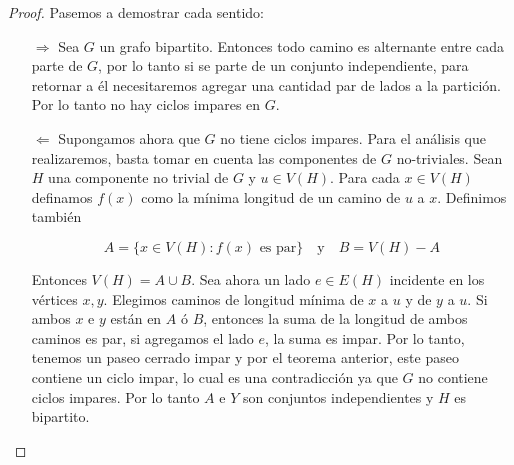 \begin{proof}
    Pasemos a demostrar cada sentido:
    
    \begin{enumerate}
        \item[$\Rightarrow$] Sea $G$ un grafo bipartito. Entonces todo camino es alternante entre cada parte de $G$, por lo tanto si se parte de un conjunto independiente, para retornar a él necesitaremos agregar una cantidad par de lados a la partición. Por lo tanto no hay ciclos impares en $G$.
        
        \item[$\Leftarrow$] Supongamos ahora que $G$ no tiene ciclos impares. Para el análisis que realizaremos, basta tomar en cuenta las componentes de $G$ no-triviales. Sean $H$ una componente no trivial de $G$ y $u \in V(H)$. Para cada $x \in V(H)$ definamos $f(x)$ como la mínima longitud de un camino de $u$ a $x$. Definimos también
        
        \[
        A = \{x \in V(H) : \text{$f(x)$ es par}\} \quad \text{y} \quad B = V(H) - A
        \]
        
        Entonces $V(H) = A \cup B$. Sea ahora un lado $e \in E(H)$ incidente en los vértices $x, y$. Elegimos caminos de longitud mínima de $x$ a $u$ y de $y$ a $u$. Si ambos $x$ e $y$ están en $A$ ó $B$, entonces la suma de la longitud de ambos caminos es par, si agregamos el lado $e$, la suma es impar. Por lo tanto, tenemos un paseo cerrado impar y por el teorema anterior, este paseo contiene un ciclo impar, lo cual es una contradicción ya que $G$ no contiene ciclos impares. Por lo tanto $A$ e $Y$ son conjuntos independientes y $H$ es bipartito.

        \begin{figure}
            \centering
        \end{figure}
    \end{enumerate}
\end{proof}

